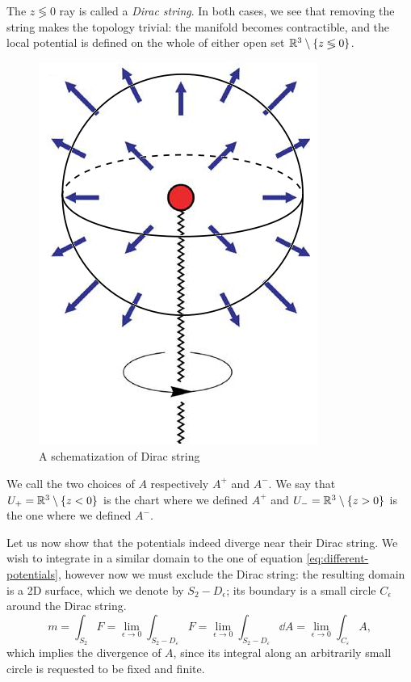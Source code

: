 \documentclass[main.tex]{subfiles}
\begin{document}
%
The \(z \lessgtr 0\) ray is called a \emph{Dirac string}.
%
%
%
In both cases, we see that removing the string makes the topology trivial: the manifold becomes contractible, and the local potential is defined on the whole of either open set $\mathbb{R}^3\setminus \qty{z \lessgtr 0}$.
%
\begin{figure}[h]
\centering
\includegraphics[scale=0.3]{DiracMon.png}
\caption{A schematization of Dirac string}
\label{fig-DirMon}
\end{figure}

We call the two choices of $A$ respectively $A^+$ and $A^-$.
We say that $U_+ = \mathbb{R}^3 \setminus \qty{z<0}$ is the chart where we defined $A^+$ and $U_- = \mathbb{R}^3 \setminus \qty{z>0}$ is the one where we defined $A^-$.

Let us now show that the potentials indeed diverge near their Dirac string. We wish to integrate in a similar domain to the one of equation \eqref{eq:different-potentials}, however now we must exclude the Dirac string: the resulting domain is a 2D surface, which we denote by $S_2 - D_\epsilon$; its boundary is a small circle $C_\epsilon$ around the Dirac string.
%
\begin{equation}\label{MagCharge}
m=\int_{S_2} F=\lim_{\epsilon\to 0}\int_{S_2-D_{\varepsilon}}F=\lim_{\epsilon\to 0}\int_{S_2-D_{\varepsilon}} \dd{A}=\lim_{\epsilon\to 0}\int_{C_{\varepsilon}} A,
\end{equation}
which implies the divergence of $A$, since its integral along an arbitrarily small circle is requested to be fixed and finite.
\end{document}
